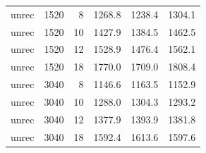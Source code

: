 \documentclass[11pt,a4paper,]{article}
\let\origtable\table
\let\endorigtable\endtable
\renewenvironment{table}[1][2] {
    \expandafter\origtable\expandafter[!htbp]
} {
    \endorigtable
}
\begin{document}
\begin{table}[!h]
\begin{tabular}[t]{lrrrrr}
unrec & 1520 & 8 & 1268.8 & 1238.4 & 1304.1\\
unrec & 1520 & 10 & 1427.9 & 1384.5 & 1462.5\\
unrec & 1520 & 12 & 1528.9 & 1476.4 & 1562.1\\
unrec & 1520 & 18 & 1770.0 & 1709.0 & 1808.4\\
unrec & 3040 & 8 & 1146.6 & 1163.5 & 1152.9\\
unrec & 3040 & 10 & 1288.0 & 1304.3 & 1293.2\\
unrec & 3040 & 12 & 1377.9 & 1393.9 & 1381.8\\
unrec & 3040 & 18 & 1592.4 & 1613.6 & 1597.6\\
\bottomrule
\end{tabular}
\end{table}

\begin{table}[!h]


\end{table}
\end{document}
